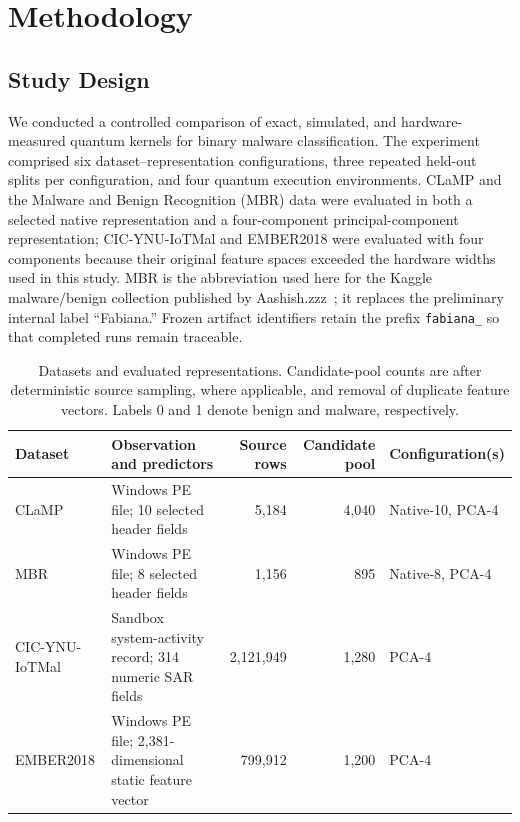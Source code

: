 %

\section{Methodology}

\subsection{Study Design}

We conducted a controlled comparison of exact, simulated, and hardware-measured quantum kernels for binary malware classification. The experiment comprised six dataset--representation configurations, three repeated held-out splits per configuration, and four quantum execution environments. CLaMP and the Malware and Benign Recognition (MBR) data were evaluated in both a selected native representation and a four-component principal-component representation; CIC-YNU-IoTMal and EMBER2018 were evaluated with four components because their original feature spaces exceeded the hardware widths used in this study. MBR is the abbreviation used here for the Kaggle malware/benign collection published by Aashish.zzz~\cite{synthetic}; it replaces the preliminary internal label ``Fabiana.'' Frozen artifact identifiers retain the prefix \texttt{fabiana\_} so that completed runs remain traceable.

\begin{table}[t]
\centering
\small
\caption{Datasets and evaluated representations. Candidate-pool counts are after deterministic source sampling, where applicable, and removal of duplicate feature vectors. Labels 0 and 1 denote benign and malware, respectively.}
\label{tab:dataset-design}
\begin{tabular}{lp{2.75in}rrl}
\toprule
Dataset & Observation and predictors & Source rows & Candidate pool & Configuration(s) \\
\midrule
CLaMP & Windows PE file; 10 selected header fields & 5,184 & 4,040 & Native-10, PCA-4 \\
MBR & Windows PE file; 8 selected header fields & 1,156 & 895 & Native-8, PCA-4 \\
CIC-YNU-IoTMal & Sandbox system-activity record; 314 numeric SAR fields & 2,121,949 & 1,280 & PCA-4 \\
EMBER2018 & Windows PE file; 2,381-dimensional static feature vector & 799,912 & 1,200 & PCA-4 \\
\bottomrule
\end{tabular}
\end{table}

